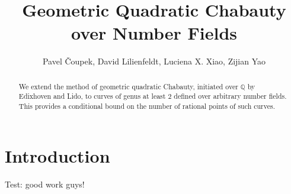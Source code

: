 \documentclass[11pt,oneside]{amsart}
\theoremstyle{plain}
\theoremstyle{definition}
\def\Q{\mathbb{Q}}
\begin{document}
 

 \title[Geometric Quadratic Chabauty]{\small Geometric Quadratic Chabauty over Number Fields}
\author{Pavel \v{C}oupek, David Lilienfeldt, Luciena X. Xiao, Zijian Yao}
\address[Pavel \v{C}oupek]{Department of Mathematics, Purdue University}
 \address[David Lilienfeldt]{Department of Mathematics, McGill University}
 \address[Luciena X. Xiao]{Department of Mathematics, California Institute of Technology}
\address[Zijian Yao]{Department of Mathematics, Harvard University}
\maketitle

\begin{abstract}
We extend the method of geometric quadratic Chabauty, initiated over $\Q$ by Edixhoven and Lido, to curves of genus at least $2$ defined over arbitrary number fields. This provides a conditional bound on the number of rational points of such curves. %
\end{abstract}


\tableofcontents
 
\vspace*{-1cm}
\section{Introduction} 

Test: good work guys! 
 
\end{document}
